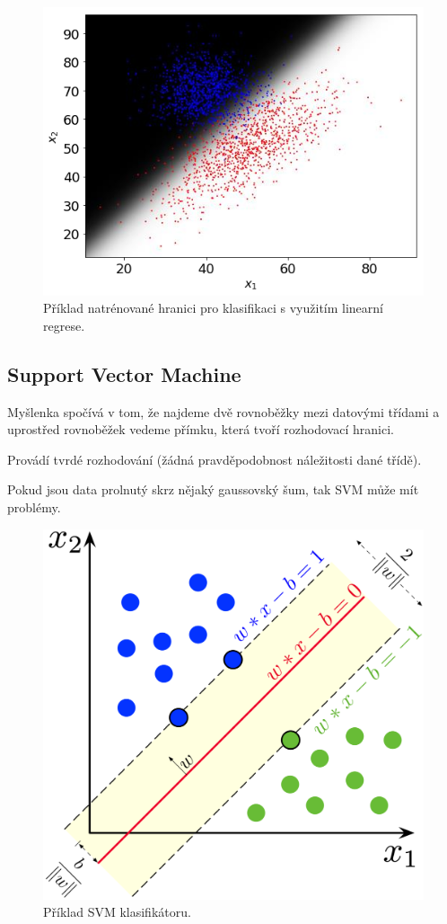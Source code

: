 \begin{figure}[H]
    \centering
    \includegraphics[width=0.7\linewidth]{linear_regression.png}
    \caption{Příklad natrénované hranici pro klasifikaci s využitím linearní regrese.}
\end{figure}

\subsection{Support Vector Machine}

\begin{compactitem}
    \item Myšlenka spočívá v tom, že najdeme dvě rovnoběžky mezi datovými třídami a uprostřed rovnoběžek vedeme přímku, která tvoří rozhodovací hranici.

    \item Provádí tvrdé rozhodování (žádná pravděpodobnost náležitosti dané třídě).

    \item Pokud jsou data prolnutý skrz nějaký gaussovský šum, tak SVM může mít problémy.
\end{compactitem}

\begin{figure}[H]
    \centering
    \includegraphics[width=0.6\linewidth]{svm.png}
    \caption{Příklad SVM klasifikátoru.}
\end{figure}
